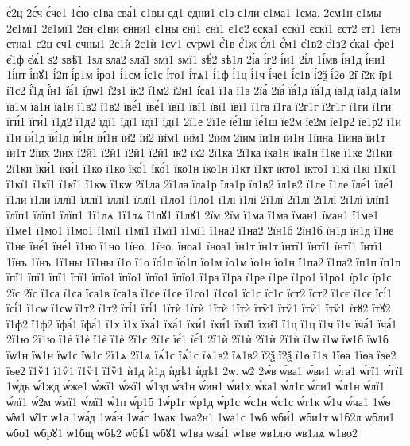 {є́2ц
2є́ч
є́че1
1є́ю
є1ва
єва́1
є1вы
єд1
єдни1
є1з
є1ли
є1ма1
1єма.
2єм1н
є1мы
2є1мї1
2є1мї1
2єн
є1ни
єнни1
є1ны
єнї1
єнї1
є1с2
єска1
єскї1
єскї1
єст2
єт1
1єтн
єтна1
є2ц
єч1
єчны1
2є1ѝ
2є1ѝ
1єѵ1
єѵрѡ1
є҆́1в
є҆́1ж
є҆́л1
є҆́м1
є҆1в2
є҆1з2
є҆ка1
є҆ре1
є҆1ф
є҆ѧ́1
ѕ2
ѕвѣ̑1
1ѕл
ѕла2
ѕла̑1
ѕмї1
ѕмї1
ѕѣ́2
ѕѣ1л
2і́а
і́г2
і́и1
2і́л
1і́мв
і́н1д
і́ни1
1і́нт
і́нꙋ1
і́2п
і́р1м
і́ро1
і́1см
і́с1с
і́то1
і́тѧ1
і́1ф
і́1ц
і́1ч
і́че1
і́є1в
і́2ѯ
і́2ѳ
2і̑
і̑2к
і̑р1
і̑1с2
і҆́1д
і҆́н1
і҆а́1
і҆дѡ1
і҆2з1
і҆к2
і҆1м2
і҆2н1
і҆са1
ї1а
ї1а
2їа́
2їа́
їа́1д
їа́1д
їа1д
їа1д
їа1м
їа1м
їа1н
їа1н
ї1в2
ї1в2
їве́1
їве́1
ївї1
ївї1
ївї1
ївї1
ї1га
ї1га
ї2г1г
ї2г1г
ї1ги
ї1ги
їги́1
їги́1
ї1д2
ї1д2
їдї1
їдї1
їдї1
їдї1
2ї1е
2ї1е
їе́1ш
їе́1ш
їе2м
їе2м
їе1р2
їе1р2
ї1и
ї1и
їи́1д
їи́1д
їи́1н
їи́1н
їи̑2
їи̑2
їи̑м1
їи̑м1
2їим
2їим
їи1н
їи1н
1їина
1їина
їи1т
їи1т
2їих
2їих
ї2й1
ї2й1
ї2й1
ї2й1
їк2
їк2
2ї1ка
2ї1ка
їка1н
їка1н
ї1ке
ї1ке
2ї1ки
2ї1ки
їки́1
їки́1
ї1ко
ї1ко
їко́1
їко́1
їко1н
їко1н
ї1кт
ї1кт
їкто1
їкто1
ї1кі
ї1кі
ї1кї1
ї1кї1
ї1кї1
ї1кї1
ї1кѡ
ї1кѡ
2ї1ла
2ї1ла
їла1р
їла1р
їл1в2
їл1в2
ї1ле
ї1ле
їле́1
їле́1
ї1ли
ї1ли
їллї1
їллї1
їллї1
їллї1
ї1ло1
ї1ло1
ї1лі
ї1лі
2ї1лї
2ї1лї
2ї1лї
2ї1лї
їлїп1
їлїп1
їлїп1
їлїп1
1ї1лѧ
1ї1лѧ
ї1лꙋ1
ї1лꙋ1
2їм
2їм
ї1ма
ї1ма
їман1
їман1
ї1ме1
ї1ме1
ї1мо1
ї1мо1
ї1мї1
ї1мї1
ї1мї1
ї1мї1
ї1на2
ї1на2
2їн1б
2їн1б
їн1д
їн1д
ї1не
ї1не
їне́1
їне́1
ї1но
ї1но
1їно.
1їно.
їноа1
їноа1
їн1т
їн1т
їнтї1
їнтї1
їнтї1
їнтї1
1їнъ
1їнъ
1ї1ны
1ї1ны
ї1о
ї1о
їо́1п
їо́1п
їо1м
їо1м
їо1н
їо1н
ї1па2
ї1па2
їп1п
їп1п
їпї1
їпї1
їпї1
їпї1
їпїо1
їпїо1
їпїо1
їпїо1
ї1ра
ї1ра
ї1ре
ї1ре
ї1ро1
ї1ро1
їр1с
їр1с
2їс
2їс
ї1са
ї1са
їса1в
їса1в
ї1се
ї1се
ї1со1
ї1со1
їс1с
їс1с
їст2
їст2
ї1сє
ї1сє
їсі́1
їсі́1
ї1сѡ
ї1сѡ
ї1т2
ї1т2
їті́1
їті́1
1їтѝ
1їтѝ
1їтѝ
1їтѝ
їтѷ1
їтѷ1
їтѷ1
їтѷ1
їтꙋ2
їтꙋ2
ї1ф2
ї1ф2
їфа́1
їфа́1
ї1х
ї1х
їха́1
їха́1
їхи́1
їхи́1
їхи̑1
їхи̑1
ї1ц
ї1ц
ї1ч
ї1ч
їча́1
їча́1
2ї1ю
2ї1ю
ї1ѐ
ї1ѐ
ї1ѐ
ї1ѐ
2ї1є
2ї1є
їє́1
їє́1
2ї1ѝ
2ї1ѝ
2ї1ѝ
2ї1ѝ
ї1ѡ
ї1ѡ
їѡ1б
їѡ1б
їѡ1н
їѡ1н
їѡ1с
їѡ1с
2ї1ѧ
2ї1ѧ
їѧ́1с
їѧ́1с
їѧ1в2
їѧ1в2
ї2ѯ
ї2ѯ
ї1ѳ
ї1ѳ
1їѳа
1їѳа
їѳе2
їѳе2
ї1ѷ1
ї1ѷ1
ї1ѷ1
ї1ѷ1
ѝ1д
ѝ1д
ѝдѣ1
ѝдѣ1
2ѡ.
ѡ2́
2ѡ́в
ѡ́ва1
ѡ́ви1
ѡ́га1
ѡ́гї1
ѡ́гї1
1ѡ́дь
ѡ́1жд
ѡ́же1
ѡ́жї1
ѡ́жї1
ѡ́1зд
ѡ́з1н
ѡ́ин1
ѡ́и1х
ѡ́ка1
ѡ́л1г
ѡ́ли1
ѡ́л1н
ѡ́лї1
ѡ́лї1
ѡ́2м
ѡ́мї1
ѡ́мї1
ѡ́1п
ѡ́р1б
1ѡ́р1г
ѡ́р1д
ѡ́р1с
ѡ́с1н
ѡ́с1с
ѡ́т1к
ѡ́1ч
ѡ́ча1
1ѡ́ѳ
ѡ̑м1
ѡ̑1т
ѡ1а
1ѡа́д
1ѡа́н
1ѡа́с
1ѡак
1ѡа2н1
1ѡа1с
1ѡб
ѡби́1
ѡби1т
ѡ1б2л
ѡбли1
ѡбо1
ѡбрꙋ1
ѡ1бщ
ѡбѣ2
ѡбѣ́1
ѡбꙋ1
ѡ1ва
ѡва́1
ѡ1ве
ѡв1лю
ѡв1лѧ
ѡ1во2
}

